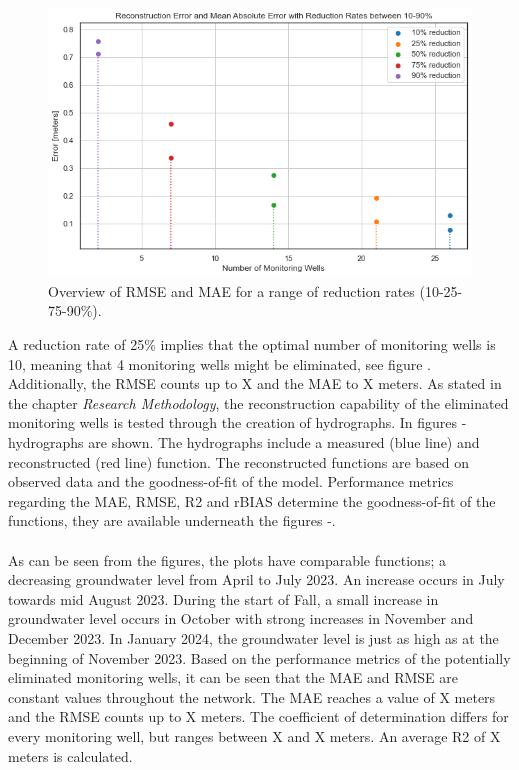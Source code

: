 \begin{figure}[h]
    \centering
    \includegraphics[width=0.60\linewidth]{frontmatter/Heijplaat-fig/rrheij.png}
    \caption{Overview of RMSE and MAE for a range of reduction rates (10-25-75-90\%).}
    \label{rmseheij}
\end{figure}
\newpage
A reduction rate of 25\% implies that the optimal number of monitoring wells is 10, meaning that 4 monitoring wells might be eliminated, see figure . Additionally, the RMSE counts up to X and the MAE to X meters. As stated in the chapter \textit{Research Methodology}\textit{}, the reconstruction capability of the eliminated monitoring wells is tested through the creation of hydrographs. In figures - hydrographs are shown. The hydrographs include a measured (blue line) and reconstructed (red line) function. The reconstructed functions are based on observed data and the goodness-of-fit of the model. Performance metrics regarding the MAE, RMSE, R2 and rBIAS determine the goodness-of-fit of the functions, they are available underneath the figures -. \\
\\
As can be seen from the figures, the plots have comparable functions; a decreasing groundwater level from April to July 2023. An increase occurs in July towards mid August 2023. During the start of Fall, a small increase in groundwater level occurs in October with strong increases in November and December 2023. In January 2024, the groundwater level is just as high as at the beginning of November 2023. Based on the performance metrics of the potentially eliminated monitoring wells, it can be seen that the MAE and RMSE are constant values throughout the network. The MAE reaches a value of X meters and the RMSE counts up to X meters. The coefficient of determination differs for every monitoring well, but ranges between X and X meters. An average R2 of X meters is calculated.
